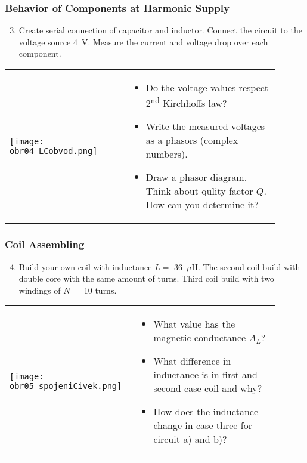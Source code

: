 \documentclass{beamer}
\begin{document}
	\begin{frame}
    \frametitle{Behavior of Components at Harmonic Supply}
		\begin{enumerate}
			\setcounter{enumi}{2}
			\item Create serial connection of capacitor and inductor. Connect the circuit to the voltage source 4~V. Measure the current and voltage drop over each component.
		\end{enumerate}
		
		\begin{center}
			\begin{tabular}{m{0.4\linewidth} m{0.5\linewidth}}
			\texttt{[image: obr04\_LCobvod.png]} &
			
			\begin{itemize}
				\item Do the voltage values respect 2\textsuperscript{nd} Kirchhoffs law?
				\item Write the measured voltages as a phasors (complex numbers).
				\item Draw a phasor diagram. Think about qulity factor $Q$. How can you determine it?
			\end{itemize}
			\end{tabular}
		\end{center}
	\end{frame}
	\begin{frame}
    \frametitle{Coil Assembling}
		\begin{enumerate}
			\setcounter{enumi}{3}
			\item Build your own coil with inductance $L=$ 36~$\mu$H. The second coil build with double core with the same amount of turns. Third coil build with two windings of $N=$ 10 turns.
		\end{enumerate}
		
		\begin{center}
			\begin{tabular}{m{0.4\linewidth} m{0.5\linewidth}}
			\texttt{[image: obr05\_spojeniCivek.png]} &
			
			\begin{itemize}
				\item What value has the magnetic conductance $A_L$?
				\item What difference in inductance is in first and second case coil and why?
				\item How does the inductance change in case three for circuit a) and b)?
			\end{itemize}
			\end{tabular}
		\end{center}
	\end{frame}
\end{document}
